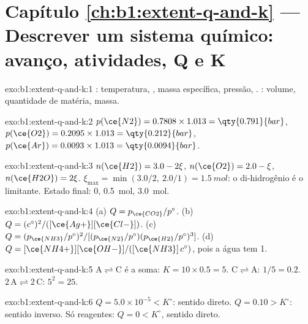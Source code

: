 \section*{Capítulo \ref{ch:b1:extent-q-and-k} --- Descrever um sistema químico: avanço, atividades, Q e K}

\begin{solution}{exo:b1:extent-q-and-k:1}
: temperatura, , massa específica, pressão,
. : volume, quantidade de matéria, massa.
\end{solution}

\begin{solution}{exo:b1:extent-q-and-k:2}
$p(\ce{N2}) = 0.7808 \times 1.013 = \qty{0.791}{bar}$, $p(\ce{O2}) =
0.2095 \times 1.013 = \qty{0.212}{bar}$, $p(\ce{Ar}) = 0.0093 \times 1.013
= \qty{0.0094}{bar}$.
\end{solution}

\begin{solution}{exo:b1:extent-q-and-k:3}
$n(\ce{H2}) = 3.0 - 2\xi$, $n(\ce{O2}) = 2.0 - \xi$, $n(\ce{H2O}) =
2\xi$. $\xi_{\max} = \min(3.0/2,\ 2.0/1) = \qty{1.5}{mol}$: o di-hidrogênio
é o limitante. Estado final:  0,  \qty{0.5}{mol}, 
\qty{3.0}{mol}.
\end{solution}

\begin{solution}{exo:b1:extent-q-and-k:4}
(a) $Q = p_{\ce{CO2}}/p^\circ$. (b) $Q = (c^\circ)^2/([\ce{Ag+}][\ce{Cl-}])$.
(c) $Q = (p_{\ce{NH3}}/p^\circ)^2/[(p_{\ce{N2}}/p^\circ)(p_{\ce{H2}}/p^\circ)^3]$.
(d) $Q = [\ce{NH4+}][\ce{OH-}]/([\ce{NH3}]\,c^\circ)$, pois a água tem  1.
\end{solution}

\begin{solution}{exo:b1:extent-q-and-k:5}
$\mathrm{A \rightleftharpoons C}$ é a soma: $K = 10 \times 0.5 = 5$. $\mathrm{C \rightleftharpoons A}$: $1/5 =
0.2$. $\mathrm{2\,A \rightleftharpoons 2\,C}$: $5^2 = 25$.
\end{solution}

\begin{solution}{exo:b1:extent-q-and-k:6}
$Q = 5.0 \times 10^{-5} < K^\circ$: sentido direto. $Q = 0.10 > K^\circ$:
sentido inverso. Só reagentes: $Q = 0 < K^\circ$, sentido direto.
\end{solution}

